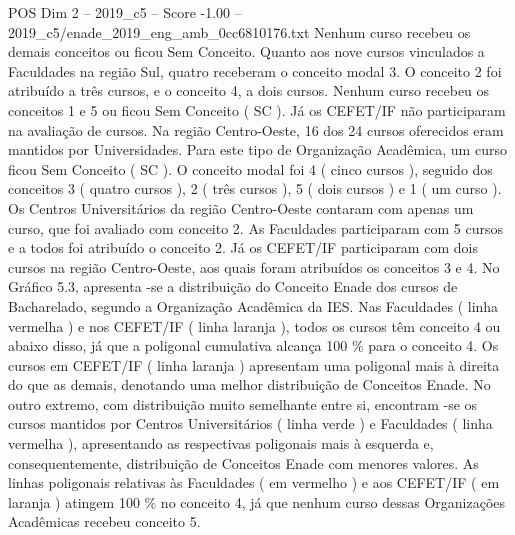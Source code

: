 \begin{textsample}{POS Dim 2 – 2019\_c5 – Score -1.00 – 2019\_c5/enade\_2019\_eng\_amb\_0cc6810176.txt}
Nenhum curso recebeu os demais conceitos ou ficou Sem Conceito.
Quanto aos nove cursos vinculados a Faculdades na região Sul, quatro receberam o conceito modal 3.
O conceito 2 foi atribuído a três cursos, e o conceito 4, a dois cursos.
Nenhum curso recebeu os conceitos 1 e 5 ou ficou Sem Conceito ( SC ).
Já os CEFET/IF não participaram na avaliação de cursos.
Na região Centro-Oeste, 16 dos 24 cursos oferecidos eram mantidos por Universidades.
Para este tipo de Organização Acadêmica, um curso ficou Sem Conceito ( SC ).
O conceito modal foi 4 ( cinco cursos ), seguido dos conceitos 3 ( quatro cursos ), 2 ( três cursos ), 5 ( dois cursos ) e 1 ( um curso ).
Os Centros Universitários da região Centro-Oeste contaram com apenas um curso, que foi avaliado com conceito 2.
As Faculdades participaram com 5 cursos e a todos foi atribuído o conceito 2.
Já os CEFET/IF participaram com dois cursos na região Centro-Oeste, aos quais foram atribuídos os conceitos 3 e 4.
No Gráfico 5.3, apresenta -se a distribuição do Conceito Enade dos cursos de Bacharelado, segundo a Organização Acadêmica da IES.
Nas Faculdades ( linha vermelha ) e nos CEFET/IF ( linha laranja ), todos os cursos têm conceito 4 ou abaixo disso, já que a poligonal cumulativa alcança 100 \% para o conceito 4.
Os cursos em CEFET/IF ( linha laranja ) apresentam uma poligonal mais à direita do que as demais, denotando uma melhor distribuição de Conceitos Enade.
No outro extremo, com distribuição muito semelhante entre si, encontram -se os cursos mantidos por Centros Universitários ( linha verde ) e Faculdades ( linha vermelha ), apresentando as respectivas poligonais mais à esquerda e, consequentemente, distribuição de Conceitos Enade com menores valores.
As linhas poligonais relativas às Faculdades ( em vermelho ) e aos CEFET/IF ( em laranja ) atingem 100 \% no conceito 4, já que nenhum curso dessas Organizações Acadêmicas recebeu conceito 5.

\end{textsample}
